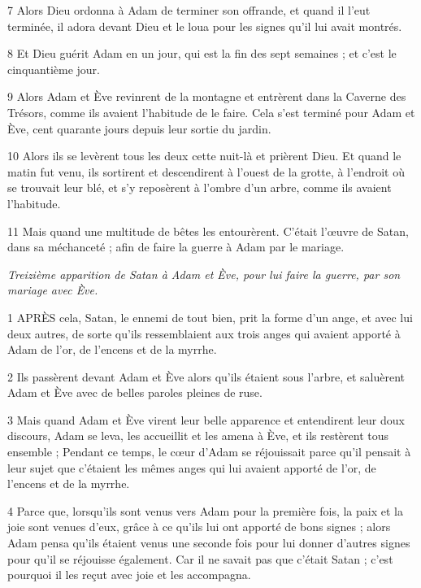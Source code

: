 \par 7 Alors Dieu ordonna à Adam de terminer son offrande, et quand il l'eut terminée, il adora devant Dieu et le loua pour les signes qu'il lui avait montrés.

\par 8 Et Dieu guérit Adam en un jour, qui est la fin des sept semaines ; et c'est le cinquantième jour.

\par 9 Alors Adam et Ève revinrent de la montagne et entrèrent dans la Caverne des Trésors, comme ils avaient l'habitude de le faire. Cela s'est terminé pour Adam et Ève, cent quarante jours depuis leur sortie du jardin.

\par 10 Alors ils se levèrent tous les deux cette nuit-là et prièrent Dieu. Et quand le matin fut venu, ils sortirent et descendirent à l'ouest de la grotte, à l'endroit où se trouvait leur blé, et s'y reposèrent à l'ombre d'un arbre, comme ils avaient l'habitude.

\par 11 Mais quand une multitude de bêtes les entourèrent. C'était l'œuvre de Satan, dans sa méchanceté ; afin de faire la guerre à Adam par le mariage.


\par \textit{Treizième apparition de Satan à Adam et Ève, pour lui faire la guerre, par son mariage avec Ève.}

\par 1 APRÈS cela, Satan, le ennemi de tout bien, prit la forme d'un ange, et avec lui deux autres, de sorte qu'ils ressemblaient aux trois anges qui avaient apporté à Adam de l'or, de l'encens et de la myrrhe.

\par 2 Ils passèrent devant Adam et Ève alors qu'ils étaient sous l'arbre, et saluèrent Adam et Ève avec de belles paroles pleines de ruse.

\par 3 Mais quand Adam et Ève virent leur belle apparence et entendirent leur doux discours, Adam se leva, les accueillit et les amena à Ève, et ils restèrent tous ensemble ; Pendant ce temps, le cœur d'Adam se réjouissait parce qu'il pensait à leur sujet que c'étaient les mêmes anges qui lui avaient apporté de l'or, de l'encens et de la myrrhe.

\par 4 Parce que, lorsqu'ils sont venus vers Adam pour la première fois, la paix et la joie sont venues d'eux, grâce à ce qu'ils lui ont apporté de bons signes ; alors Adam pensa qu'ils étaient venus une seconde fois pour lui donner d'autres signes pour qu'il se réjouisse également. Car il ne savait pas que c'était Satan ; c'est pourquoi il les reçut avec joie et les accompagna.

